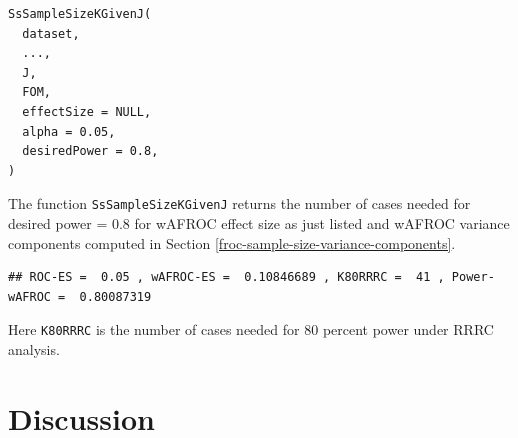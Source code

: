 \documentclass[
]{book}
\newenvironment{Shaded}{\begin{snugshade}}{\end{snugshade}}
\newcommand{\AttributeTok}[1]{\textcolor[rgb]{0.77,0.63,0.00}{#1}}
\newcommand{\ConstantTok}[1]{\textcolor[rgb]{0.00,0.00,0.00}{#1}}
\newcommand{\DecValTok}[1]{\textcolor[rgb]{0.00,0.00,0.81}{#1}}
\newcommand{\FunctionTok}[1]{\textcolor[rgb]{0.00,0.00,0.00}{#1}}
\newcommand{\NormalTok}[1]{#1}
\newcommand{\OtherTok}[1]{\textcolor[rgb]{0.56,0.35,0.01}{#1}}
\newcommand{\SpecialCharTok}[1]{\textcolor[rgb]{0.00,0.00,0.00}{#1}}
\newcommand{\StringTok}[1]{\textcolor[rgb]{0.31,0.60,0.02}{#1}}
\begin{document}
\begin{verbatim}
SsSampleSizeKGivenJ(
  dataset,
  ...,
  J,
  FOM,
  effectSize = NULL,
  alpha = 0.05,
  desiredPower = 0.8,
)
\end{verbatim}

The function \texttt{SsSampleSizeKGivenJ} returns the number of cases needed for desired power = 0.8 for wAFROC effect size as just listed and wAFROC variance components computed in Section \ref{froc-sample-size-variance-components}.

\begin{Shaded}
\end{Shaded}

\begin{verbatim}
## ROC-ES =  0.05 , wAFROC-ES =  0.10846689 , K80RRRC =  41 , Power-wAFROC =  0.80087319
\end{verbatim}

Here \texttt{K80RRRC} is the number of cases needed for 80 percent power under RRRC analysis.

\hypertarget{discussion}{%
\section{Discussion}\label{discussion}}
\end{document}
